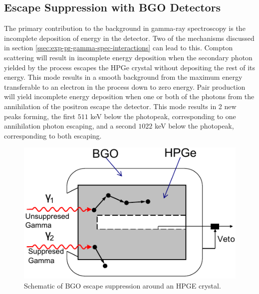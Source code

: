 \subsection{Escape Suppression with BGO Detectors}
\label{ssec:exp-pr-gamma-spec-escape-supress}
The primary contribution to the background in gamma-ray spectroscopy is the incomplete deposition of energy in the detector. Two of the mechanisms discussed in section \ref{ssec:exp-pr-gamma-spec-interactions} can lead to this. Compton scattering will result in incomplete energy deposition when the secondary photon yielded by the process escapes the HPGe crystal without depositing the rest of its energy. This mode results in a smooth background from the maximum energy transferable to an electron in the process down to zero energy. Pair production will yield incomplete energy deposition when one or both of the photons from the annihilation of the positron escape the detector. This mode results in 2 new peaks forming, the first $511$ keV below the photopeak, corresponding to one annihilation photon escaping, and a second $1022$ keV below the photopeak, corresponding to both escaping.
\begin{figure}[h!]
	\centerline{\includegraphics[height=0.25\textheight]{./img/c3/BGO_schematic.pdf}}
	\caption{Schematic of BGO escape suppression around an HPGE crystal.\label{fig:chp3-supression-schematic}}
\end{figure}

